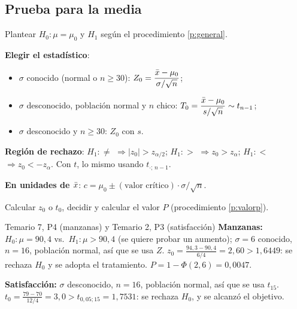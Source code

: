 \subsection{Prueba para la media}\label{p:pmu}
\begin{pasos}
\begin{pasolista}
\item Plantear $H_0:\mu=\mu_0$ y $H_1$ según el procedimiento \ref{p:general}.
\item \textbf{Elegir el estadístico}:
\begin{itemize}
\item $\sigma$ conocido (normal o $n\ge30$): $Z_0=\dfrac{\bar{x}-\mu_0}{\sigma/\sqrt n}$;
\item $\sigma$ desconocido, población normal y $n$ chico: $T_0=\dfrac{\bar{x}-\mu_0}{s/\sqrt n}\sim t_{n-1}$;
\item $\sigma$ desconocido y $n\ge30$: $Z_0$ con $s$.
\end{itemize}
\item \textbf{Región de rechazo}: $H_1:\neq$ $\Rightarrow|z_0|>z_{\alpha/2}$; \quad $H_1:>$ $\Rightarrow z_0>z_\alpha$; \quad $H_1:<$ $\Rightarrow z_0<-z_\alpha$. Con $t$, lo mismo usando $t_{\cdot;\,n-1}$.
\item \textbf{En unidades de $\bar{x}$}: $c=\mu_0\pm(\text{valor crítico})\cdot\sigma/\sqrt n$.
\item Calcular $z_0$ o $t_0$, decidir y calcular el valor $P$ (procedimiento \ref{p:valorp}).
\end{pasolista}
\end{pasos}
\begin{modelo}{Temario 7, P4 (manzanas) y Temario 2, P3 (satisfacción)}
\textbf{Manzanas:} $H_0:\mu=90{,}4$ vs.\ $H_1:\mu>90{,}4$ (se quiere probar un aumento); $\sigma=6$ conocido, $n=16$, población normal, así que se usa $Z$.
$z_0=\frac{94{,}3-90{,}4}{6/4}=2{,}60>1{,}6449$: se rechaza $H_0$ y se adopta el tratamiento. $P=1-\Phi(2{,}6)=0{,}0047$.

\textbf{Satisfacción:} $\sigma$ desconocido, $n=16$, población normal, así que se usa $t_{15}$. $t_0=\frac{79-70}{12/4}=3{,}0>t_{0,05;15}=1{,}7531$: se rechaza $H_0$, y se alcanzó el objetivo.
\end{modelo}

